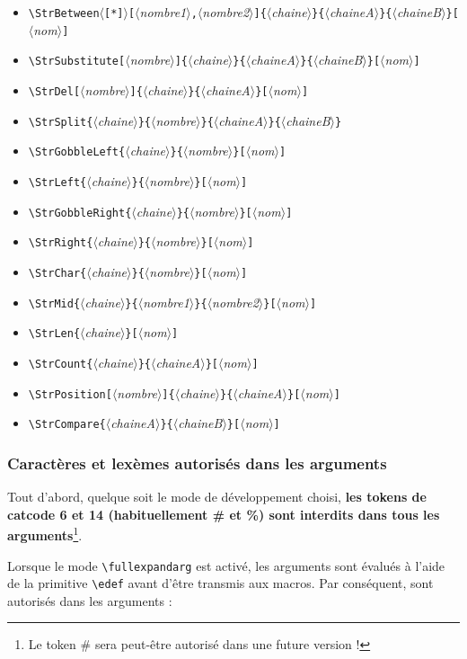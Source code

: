 \documentclass[a4paper,10pt]{article}
\newcommand\argu[1]{$\langle$\textit{#1}$\rangle$}
\newcommand\ARGU[1]{\texttt{\color{black}\{}\argu{#1}\texttt{\color{black}\}}}
\newcommand\arguC[1]{\texttt{\color{black}[}\argu{#1}\texttt{\color{black}]}}
\newcommand\arguCC[2]{\texttt{\color{black}[}\argu{#1}\texttt{\color{black},}\argu{#2}\texttt{\color{black}]}}
\newcommand\etoile{$\langle$\texttt{[*]}$\rangle$}
\newcommand\verbinline{\lstinline[basicstyle=\normalsize\ttfamily]}
\newcommand\colorise{\color{violet}}
\begin{document}
\begin{itemize}
	\item\verb|\StrBetween|\etoile{\colorise\arguCC{nombre1}{nombre2}\ARGU{chaine}\ARGU{chaineA}\ARGU{chaineB}}\arguC{nom}
	\item\verb|\StrSubstitute|{\colorise\arguC{nombre}\ARGU{chaine}\ARGU{chaineA}\ARGU{chaineB}}\arguC{nom}
	\item\verb|\StrDel|{\colorise\arguC{nombre}\ARGU{chaine}\ARGU{chaineA}}\arguC{nom}
	\item\verb|\StrSplit|{\colorise\ARGU{chaine}\ARGU{nombre}}\ARGU{chaineA}\ARGU{chaineB}
	\item\verb|\StrGobbleLeft|{\colorise\ARGU{chaine}\ARGU{nombre}}\arguC{nom}
	\item\verb|\StrLeft|{\colorise\ARGU{chaine}\ARGU{nombre}}\arguC{nom}
	\item\verb|\StrGobbleRight|{\colorise\ARGU{chaine}\ARGU{nombre}}\arguC{nom}
	\item\verb|\StrRight|{\colorise\ARGU{chaine}\ARGU{nombre}}\arguC{nom}
	\item\verb|\StrChar|{\colorise\ARGU{chaine}\ARGU{nombre}}\arguC{nom}
	\item\verb|\StrMid|{\colorise\ARGU{chaine}\ARGU{nombre1}\ARGU{nombre2}}\arguC{nom}
	\item\verb|\StrLen|{\colorise\ARGU{chaine}}\arguC{nom}
	\item\verb|\StrCount|{\colorise\ARGU{chaine}\ARGU{chaineA}}\arguC{nom}
	\item\verb|\StrPosition|{\colorise\arguC{nombre}\ARGU{chaine}\ARGU{chaineA}}\arguC{nom}
	\item\verb|\StrCompare|{\colorise\ARGU{chaineA}\ARGU{chaineB}}\arguC{nom}
\end{itemize}
\parindent0pt

\subsubsection{Caractères et lexèmes autorisés dans les arguments}
Tout d'abord, quelque soit le mode de développement choisi, \textbf{les tokens de catcode 6 et 14 (habituellement {\ttfamily\#} et {\ttfamily\%}) sont interdits dans tous les arguments}\footnote{Le token {\ttfamily\#} sera peut-être autorisé dans une future version !}.\bigskip

Lorsque le mode \verbinline|\fullexpandarg| est activé, les arguments sont évalués à l'aide de la primitive \verb|\edef| avant d'être transmis aux macros. Par conséquent, sont autorisés dans les arguments :
\end{document}

